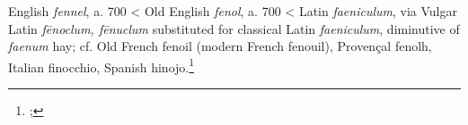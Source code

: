 \begin{etymology}\label{ety:fennel}
English \textit{fennel}, a. 700
< Old English \textit{fenol}, a. 700
< Latin \textit{faeniculum}, via Vulgar Latin \textit{fēnoclum, fēnuclum} substituted for classical Latin \textit{faeniculum}, diminutive of \textit{faenum} hay; cf. Old French fenoil (modern French fenouil), Provençal fenolh, Italian finocchio, Spanish hinojo.\footnote{\textcite[s.v. fennel]{oed}; }
\end{etymology}